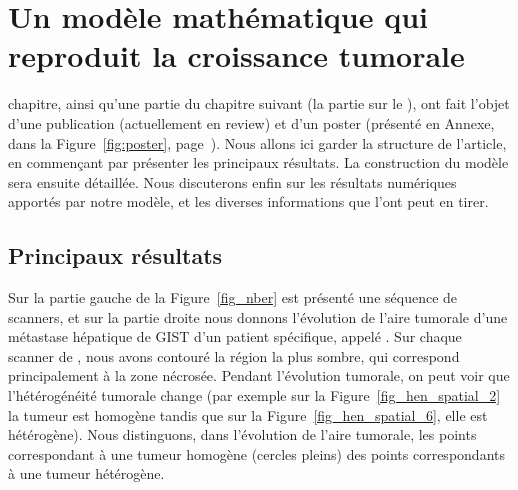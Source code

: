 \documentclass[main.tex]{subfiles}
\begin{document}
\chapter{Un modèle mathématique qui reproduit la croissance tumorale \label{chap:modele_EDP}}


 chapitre, ainsi qu'une partie du chapitre suivant (la partie sur le \twinweno), ont  fait l'objet d'une publication (actuellement en review) et d'un poster (présenté en Annexe, dans la Figure~\ref{fig:poster}, page~\pageref{fig:poster}). Nous allons ici garder la structure de l'article, en commençant par présenter les principaux résultats. La construction du modèle sera ensuite détaillée. Nous discuterons enfin sur les résultats numériques apportés par notre modèle, et les diverses informations que l'ont peut en tirer.

\section{Principaux résultats}
Sur la partie gauche de la Figure~\ref{fig_nber} est présenté une séquence de scanners, et sur la partie droite nous donnons l'évolution de l'aire tumorale d'une métastase hépatique de GIST d'un patient spécifique, appelé \Nber. Sur chaque scanner de \Nber, nous avons contouré la région la plus sombre, qui correspond principalement à la zone nécrosée.  
Pendant l'évolution tumorale, on peut voir que l'hétérogénéité tumorale change (par exemple sur la Figure~\ref{fig_hen_spatial_2} la tumeur est homogène tandis que sur la Figure~\ref{fig_hen_spatial_6}, elle est hétérogène). Nous distinguons, dans l'évolution de l'aire tumorale,  les points correspondant à une tumeur homogène (cercles pleins) des points correspondants à une tumeur hétérogène.
\end{document}
